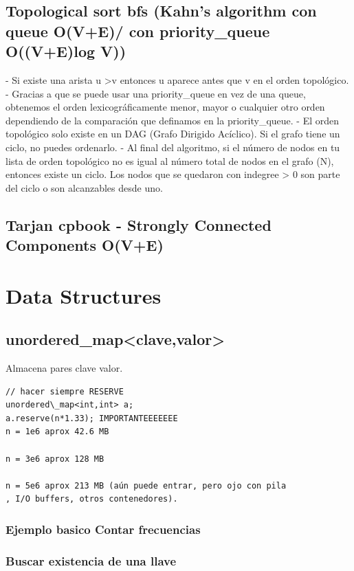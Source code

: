 \subsection{Topological sort bfs (Kahn's algorithm  con queue O(V+E)/ con priority\_queue O((V+E)log V))}
- Si existe una arista u \textendash{}\textgreater v entonces u aparece antes que v en el orden topológico.
- Gracias a que se puede usar una priority\_queue en vez de una queue, obtenemos el orden
lexicográficamente menor, mayor o cualquier otro orden dependiendo de la comparación que
definamos en la priority\_queue.
- El orden topológico solo existe en un DAG (Grafo Dirigido Acíclico). Si el grafo tiene un ciclo, 
no puedes ordenarlo.
- Al final del algoritmo, si el número de nodos en tu lista de orden topológico
 no es igual al número total de nodos en el grafo (N), entonces existe un ciclo.
 Los nodos que se quedaron con indegree > 0 son parte del ciclo o son alcanzables desde uno.
\raggedbottom
\hrulefill
\subsection{Tarjan cpbook - Strongly Connected Components O(V+E)}
\raggedbottom
\hrulefill

\section{Data Structures}
\subsection{unordered\_map\textless clave,valor\textgreater}
Almacena pares clave valor.
\begin{verbatim}
// hacer siempre RESERVE
unordered\_map<int,int> a;
a.reserve(n*1.33); IMPORTANTEEEEEEE
n = 1e6 aprox 42.6 MB

n = 3e6 aprox 128 MB

n = 5e6 aprox 213 MB (aún puede entrar, pero ojo con pila
, I/O buffers, otros contenedores).
\end{verbatim}

\subsubsection{Ejemplo basico Contar frecuencias}
\raggedbottom
\subsubsection{Buscar existencia de una llave}
\raggedbottom
